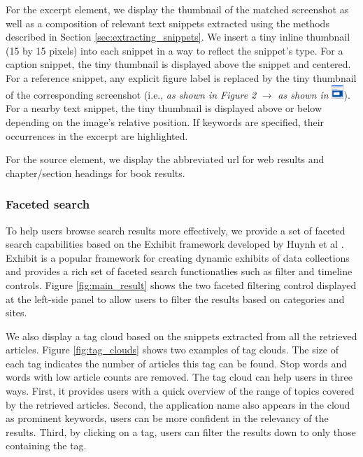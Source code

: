 \documentclass{www2010-submission}
\begin{document}
For the excerpt element, we display the thumbnail of the matched
screenshot as well as a composition of relevant text snippets
extracted using the methods described in Section
\ref{sec:extracting_snippets}. We insert a tiny inline thumbnail (15
by 15 pixels) into each snippet in a way to reflect the snippet's
type. For a caption snippet, the tiny thumbnail is displayed above the
snippet and centered. For a reference snippet, any explicit figure
label is replaced by the tiny thumbnail of the corresponding
screenshot (i.e., \emph{as shown in Figure 2} $\rightarrow$ \emph{as shown in}
\includegraphics[height=0.2in]{figure/tiny.png}). For a nearby text snippet, the
tiny thumbnail is displayed above or below depending on the image's
relative position. If keywords are specified, their occurrences in the
excerpt are highlighted.

For the source element, we display the abbreviated url for web
results and chapter/section headings for book results.

\subsubsection{Faceted search}

To help users browse search results more effectively, we provide a set
of faceted search capabilities based on the Exhibit framework
developed by Huynh et al \cite{Huynh}. Exhibit is a popular framework for
creating dynamic exhibits of data collections and provides a rich set
of faceted search functionatlies such as filter and timeline
controls. Figure \ref{fig:main_result} shows the two faceted filtering
control displayed at the left-side panel to allow users to filter the results
based on categories and sites.

We also display a tag cloud based on the snippets extracted from all
the retrieved articles. Figure \ref{fig:tag_clouds} shows two examples
of tag clouds.  The size of each tag indicates the number of articles
this tag can be found.  Stop words and words with low article counts
are removed. The tag cloud can help users in three ways. First, it
provides users with a quick overview of the range of topics covered by the
retrieved articles.  Second, the application name also appears in the
cloud as prominent keywords, users can be more confident in the
relevancy of the results. Third, by clicking on a tag, users can
filter the results down to only those containing the tag.
\end{document}
